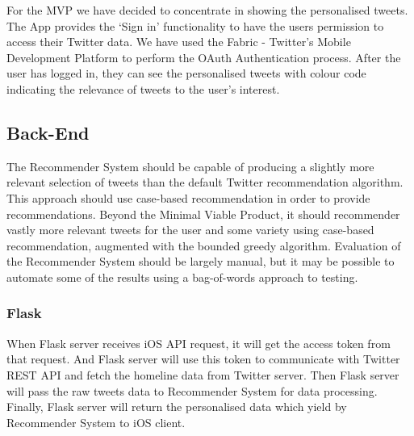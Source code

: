 \documentclass{article}
\begin{document}
For the MVP we have decided to concentrate in showing the personalised tweets.
The App provides the ‘Sign in’ functionality to have the users permission to access their 
Twitter data. We have used the Fabric - Twitter’s Mobile Development Platform to perform the OAuth Authentication process. After the user has logged in, they can see the personalised tweets with colour code indicating the relevance of tweets to the user's interest. 


\subsection{Back-End}

The Recommender System should be capable of producing a slightly more relevant selection of tweets than the default Twitter recommendation algorithm. This approach should use case-based recommendation in order to provide recommendations. Beyond the Minimal Viable Product, it should recommender vastly more relevant tweets for the user and some variety using case-based recommendation, augmented with the bounded greedy algorithm. Evaluation of the Recommender System should be largely manual, but it may be possible to automate some of the results using a bag-of-words approach to testing.

\subsubsection*{Flask}
When Flask server receives iOS API request, it will get the access token from that request. And Flask server will use this token to communicate with Twitter REST API and fetch the homeline data from Twitter server. Then Flask server will pass the raw tweets data to Recommender System for data processing. Finally, Flask server will return the personalised data which yield by Recommender System to iOS client.
\end{document}
